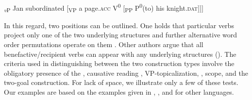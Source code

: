 \documentclass[output=paper,nonflat,colorlinks,citecolor=brown,newtxmath]{langsci/langscibook}
\begin{document}
\ea  \label{ex:witkos:22} \minsp{[} \textsubscript{\textit{v}P} Jan subordinated [\textsubscript{VP} a page.\textsc{acc} V\textsuperscript{0} [\textsubscript{PP} P\textsuperscript{0}(to) his knight.\textsc{dat}$]]]$\\
\z

\noindent In this regard, two positions can be outlined. One holds that particular verbs project only one of the two underlying structures and further alternative word order permutations operate on them \citep{dvorak2010}. Other authors argue that all benefactive/recipient verbs can appear with any underlying structures (\citealt{gracanin2006,marvinstegovec2012}). The criteria used in distinguishing between the two construction types involve the obligatory presence of the  , causative reading , VP-topicalization, ,  scope, and the two-goal construction. For lack of space, we illustrate only a few of these tests. Our  examples are based on the examples given in \cite{gracanin2006}, \cite{dvorak2010}, and \cite{marvinstegovec2012} for other languages.

\ea \label{ex:witkos:24}
	\z
\z

\ea \label{ex:witkos:25}
	\z
\z
\end{document}
